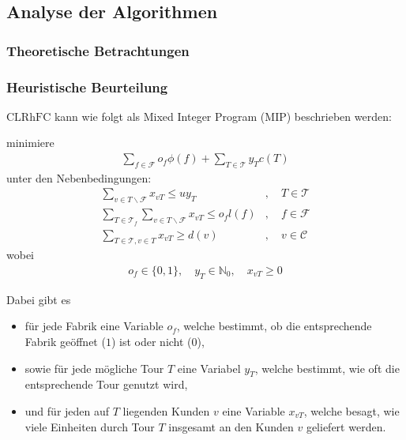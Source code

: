 \documentclass[a4paper,ngerman,11pt,bibtotoc]{scrartcl}
\theoremstyle{definition}
\theoremstyle{plain}
\theoremstyle{remark}
\newcommand{\IN}{\mathbb{N}}
\newcommand{\ClientSet}{\mathscr{C}}
\newcommand{\FacilitySet}{\mathscr{F}}
\newcommand{\allTours}{\mathscr{T}}
\newcommand{\CLRHFC}{\mathrm{CLRhFC}}
\begin{document}
	

	\subsection{Analyse der Algorithmen}\label{sec:Analyse}
	
	\subsubsection{Theoretische Betrachtungen}

		
		
	\subsubsection{Heuristische Beurteilung}
	
	$\CLRHFC$ kann wie folgt als Mixed Integer Program (MIP) beschrieben werden:
	
	\begin{center}
		minimiere
		\begin{align*}\sum_{f \in \FacilitySet} o_f \phi(f) + \sum_{T \in \allTours} y_T c(T)\end{align*}
		unter den Nebenbedingungen:
		\begin{align}	\sum_{v \in T\backslash\FacilitySet} x_{vT} \leq u y_T 								&,\quad T \in \allTours 						\\
						\sum_{T \in \allTours_f} \sum_{v \in T\backslash\FacilitySet} x_{vT} \leq o_f l(f)	&,\quad f \in \FacilitySet						\\
						\sum_{T \in \allTours, v \in T} x_{vT} \geq d(v)									&,\quad v \in \ClientSet					
		\end{align}
		wobei
		\begin{align*}o_f \in \{0,1\},\quad y_T \in \IN_0, \quad x_{vT} \geq 0\end{align*}
	\end{center}

	Dabei gibt es 
	\begin{itemize}
		\item für jede Fabrik eine Variable $o_f$, welche bestimmt, ob die entsprechende Fabrik geöffnet ($1$) ist oder nicht ($0$),
		\item sowie für jede mögliche Tour $T$ eine Variabel $y_T$, welche bestimmt, wie oft die entsprechende Tour genutzt wird,
		\item und für jeden auf $T$ liegenden Kunden $v$ eine Variable $x_{vT}$, welche besagt, wie viele Einheiten durch Tour $T$ insgesamt an den Kunden $v$ geliefert werden.
	\end{itemize}
\end{document}
